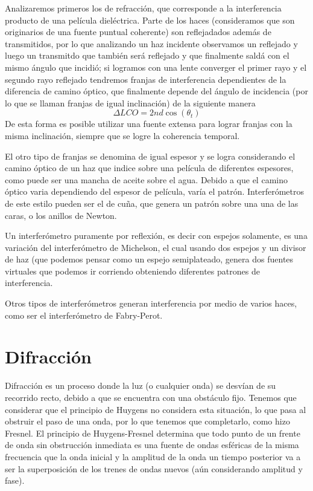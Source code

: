 \documentclass[a4paper]{article}
\numberwithin{equation}{section}
\begin{document}
	Analizaremos primeros los de refracción, que corresponde a la interferencia producto de una película dieléctrica. Parte de los haces (consideramos que son originarios de una fuente puntual coherente) son reflejadados además de transmitidos, por lo que analizando un haz incidente observamos un reflejado y luego un transmitdo que también será reflejado y que finalmente saldá con el mismo ángulo que incidió; si logramos con una lente converger el primer rayo y el segundo rayo reflejado tendremos franjas de interferencia dependientes de la diferencia de camino óptico, que finalmente depende del ángulo de incidencia (por lo que se llaman franjas de igual inclinación) de la siguiente manera
	\begin{equation}
		\Delta LCO = 2 n d \cos(\theta_t)
		\label{eq:interferencia_franjas_inclinacion}
	\end{equation}
	De esta forma es posible utilizar una fuente extensa para lograr franjas con la misma inclinación, siempre que se logre la coherencia temporal.
	
	El otro tipo de franjas se denomina de igual espesor y se logra considerando el camino óptico de un haz que indice sobre una película de diferentes espesores, como puede ser una mancha de aceite sobre el agua. Debido a que el camino óptico varia dependiendo del espesor de película, varía el patrón. Interferómetros de este estilo pueden ser el de cuña, que genera un patrón sobre una una de las caras, o los anillos de Newton.
	
	Un interferómetro puramente por reflexión, es decir con espejos solamente, es una variación del interferómetro de Michelson, el cual usando dos espejos y un divisor de haz (que podemos pensar como un espejo semiplateado, genera dos fuentes virtuales que podemos ir corriendo obteniendo diferentes patrones de interferencia.
	
	Otros tipos de interferómetros generan interferencia por medio de varios haces, como ser el interferómetro de Fabry-Perot.
\section{Difracción}
	\label{sec:difraccion}
	Difracción es un proceso donde la luz (o cualquier onda) se desvían de su recorrido recto, debido a que se encuentra con una obstáculo fijo. Tenemos que considerar que el principio de Huygens no considera esta situación, lo que pasa al obstruir el paso de una onda, por lo que tenemos que completarlo, como hizo Fresnel. El principio de Huygens-Fresnel determina que todo punto de un frente de onda sin obstrucción inmediata es una fuente de ondas esféricas de la misma frecuencia que la onda inicial y la amplitud de la onda un tiempo posterior va a ser la superposición de los trenes de ondas nuevos (aún considerando amplitud y fase).
	
\end{document}
